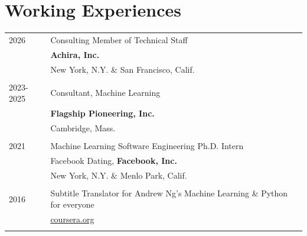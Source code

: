 \section{Working Experiences}
\begin{longtable}{p{} p{} }
\textsc{2026} & Consulting Member of Technical Staff \\
& \textbf{Achira, Inc.} \\
& New York, N.Y. \& San Francisco, Calif.\\\\

\textsc{2023-2025} & Consultant, Machine Learning \\
& \textbf{Flagship Pioneering, Inc.} \\
& Cambridge, Mass.\\\\
\textsc{2021} & Machine Learning Software Engineering Ph.D. Intern\\
 & Facebook Dating, \textbf{Facebook, Inc.}\\
 & New York, N.Y. \& Menlo Park, Calif.\\\\

 \textsc{2016} & Subtitle Translator for 
 Andrew Ng's Machine Learning \& Python for everyone\\
 & \url{coursera.org} \\\\
\end{longtable}






